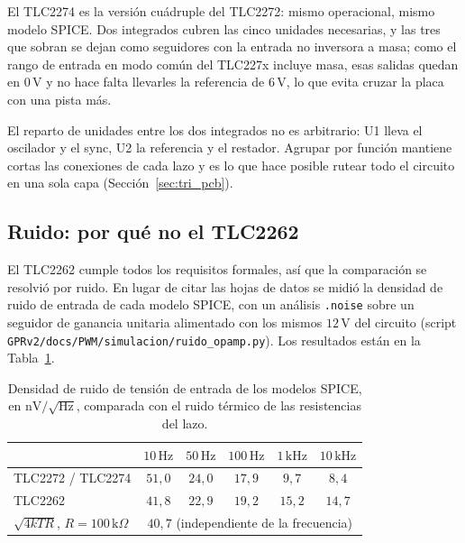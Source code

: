 \documentclass[12pt, a4paper, twoside]{report}
\begin{document}
El TLC2274 es la versión cuádruple del TLC2272: mismo operacional, mismo
modelo SPICE. Dos integrados cubren las cinco unidades necesarias, y las
tres que sobran se dejan como seguidores con la entrada no inversora a masa;
como el rango de entrada en modo común del TLC227x incluye masa, esas
salidas quedan en $0\,\text{V}$ y no hace falta llevarles la referencia de
$6\,\text{V}$, lo que evita cruzar la placa con una pista más.

El reparto de unidades entre los dos integrados no es arbitrario: U1 lleva
el oscilador y el sync, U2 la referencia y el restador. Agrupar por función
mantiene cortas las conexiones de cada lazo y es lo que hace posible rutear
todo el circuito en una sola capa (Sección~\ref{sec:tri_pcb}).

\subsection{Ruido: por qué no el TLC2262}
\label{sub:tri_ruido}

El TLC2262 cumple todos los requisitos formales, así que la comparación se
resolvió por ruido. En lugar de citar las hojas de datos se midió la
densidad de ruido de entrada de cada modelo SPICE, con un análisis
\texttt{.noise} sobre un seguidor de ganancia unitaria alimentado con los
mismos $12\,\text{V}$ del circuito (script
\texttt{GPRv2/docs/PWM/simulacion/ruido\_opamp.py}). Los resultados están en la
Tabla~\ref{tab:tri_ruido}.

\begin{table}[H]
  \centering
  \caption{Densidad de ruido de tensión de entrada de los modelos SPICE, en
  $\text{nV}/\sqrt{\text{Hz}}$, comparada con el ruido térmico de las
  resistencias del lazo.}
  \label{tab:tri_ruido}
  \begin{tabular}{lccccc}
    \toprule
    & $10\,\text{Hz}$ & $50\,\text{Hz}$ & $100\,\text{Hz}$
    & $1\,\text{kHz}$ & $10\,\text{kHz}$ \\
    \midrule
    TLC2272 / TLC2274 & $51{,}0$ & $24{,}0$ & $17{,}9$ & $9{,}7$  & $8{,}4$  \\
    TLC2262           & $41{,}8$ & $22{,}9$ & $19{,}2$ & $15{,}2$ & $14{,}7$ \\
    \midrule
    $\sqrt{4kTR}$, $R = 100\,\text{k}\Omega$
      & \multicolumn{5}{c}{$40{,}7$ (independiente de la frecuencia)} \\
    \bottomrule
  \end{tabular}
\end{table}
\end{document}

